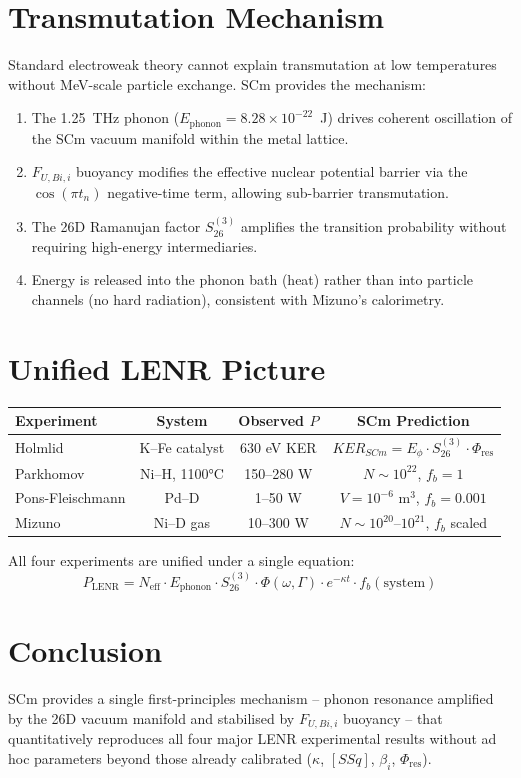 \documentclass[11pt,a4paper]{article}
\begin{document}
\section{Transmutation Mechanism}
Standard electroweak theory cannot explain transmutation at low temperatures without
MeV-scale particle exchange. SCm provides the mechanism:

\begin{enumerate}
  \item The 1.25~THz phonon ($E_{\text{phonon}} = 8.28\times10^{-22}$~J) drives coherent
        oscillation of the SCm vacuum manifold within the metal lattice.
  \item $F_{U,Bi,i}$ buoyancy modifies the effective nuclear potential barrier via the
        $\cos(\pi t_n)$ negative-time term, allowing sub-barrier transmutation.
  \item The 26D Ramanujan factor $S_{26}^{(3)}$ amplifies the transition probability
        without requiring high-energy intermediaries.
  \item Energy is released into the phonon bath (heat) rather than into particle channels
        (no hard radiation), consistent with Mizuno's calorimetry.
\end{enumerate}

\section{Unified LENR Picture}
\begin{center}
\begin{tabular}{lccc}
\hline
Experiment & System & Observed $P$ & SCm Prediction \\
\hline
Holmlid     & K--Fe catalyst & 630 eV KER & $KER_{SCm} = E_\phi \cdot S_{26}^{(3)} \cdot \Phi_{\text{res}}$ \\
Parkhomov   & Ni--H, 1100°C  & 150--280 W  & $N\sim10^{22}$, $f_b=1$ \\
Pons-Fleischmann & Pd--D    & 1--50 W     & $V=10^{-6}$ m$^3$, $f_b=0.001$ \\
Mizuno      & Ni--D gas      & 10--300 W   & $N\sim10^{20}$--$10^{21}$, $f_b$ scaled \\
\hline
\end{tabular}
\end{center}

All four experiments are unified under a single equation:
\begin{equation}
P_{\text{LENR}} = N_{\text{eff}} \cdot E_{\text{phonon}} \cdot S_{26}^{(3)} \cdot
                 \Phi(\omega,\Gamma) \cdot e^{-\kappa t} \cdot f_b(\text{system})
\end{equation}

\section{Conclusion}
SCm provides a single first-principles mechanism -- phonon resonance amplified by the
26D vacuum manifold and stabilised by $F_{U,Bi,i}$ buoyancy -- that quantitatively
reproduces all four major LENR experimental results without ad hoc parameters beyond
those already calibrated ($\kappa$, $[SSq]$, $\beta_i$, $\Phi_{\text{res}}$).
\end{document}
